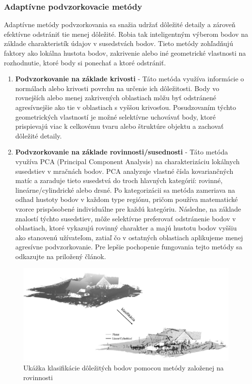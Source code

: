 \subsubsection{Adaptívne podvzorkovacie metódy}
\noindent Adaptívne metódy podvzorkovania sa snažia udržať dôležité detaily a zároveň efektívne odstrániť tie menej dôležité. Robia tak inteligentným výberom bodov na základe charakteristík údajov v susedstvách bodov. Tieto metódy zohľadňujú faktory ako lokálna hustota bodov, zakrivenie alebo iné geometrické vlastnosti na rozhodnutie, ktoré body si ponechať a ktoré odstrániť.
\begin{enumerate}
  \item\textbf{Podvzorkovanie na základe krivosti} - Táto metóda využíva informácie o normálach alebo krivosti povrchu na určenie ich dôležitosti. Body vo rovnejších alebo menej zakrivených oblastiach môžu byť odstránené agresívnejšie ako tie v oblastiach s vyššou krivosťou. Posudzovaním týchto geometrických vlastností je možné selektívne uchovávať body, ktoré prispievajú viac k celkovému tvaru alebo štruktúre objektu a zachovať dôležité detaily.
  \item\textbf{Podvzorkovanie na základe rovinnosti/susednosti} - Táto metóda využíva PCA (Principal Component Analysis) na charakterizáciu lokálnych susedstiev v mračnách bodov. PCA analyzuje vlastné čísla kovariančných matíc a zaraduje tieto susedstvá do troch hlavných kategórií: rovinné, lineárne/cylindrické alebo drsné. Po kategorizácii sa metóda zameriava na odhad hustoty bodov v každom type regiónu, pričom používa matematické vzorce prispôsobené individuálne pre každú kategóriu. Následne, na základe znalostí týchto susedstiev, môže selektívne preferovať odstránenie bodov v oblastiach, ktoré vykazujú rovinný charakter a majú hustotu bodov vyššiu ako stanovenú užívateľom, zatiaľ čo v ostatných oblastiach aplikujeme menej agresívne podvzorkovanie. Pre lepšie pochopenie fungovania tejto metódy sa odkazujte na priložený článok. \cite{adaptive_downsampling_neighborhood}
\end{enumerate}
\begin{figure}[!htbp]
  \centering
  \includegraphics[width=14cm]{img/planar_example.png}
  \caption{Ukážka klasifikácie dôležitých bodov pomocou metódy založenej na rovinnosti \cite{adaptive_downsampling_neighborhood}}
  \label{noname}
\end{figure}

